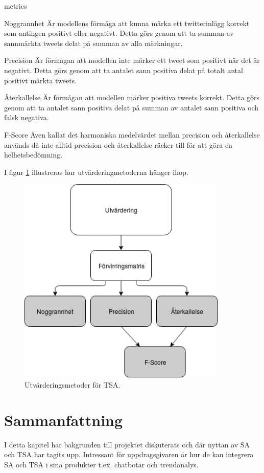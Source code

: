 \documentclass{kaumasters} %
\begin{document}
\begin{labeling}{metrics}
\item [Noggrannhet] Är modellens förmåga att kunna märka ett twitterinlägg korrekt som antingen positivt eller negativt. Detta görs genom att ta summan av sannmärkta tweets delat på summan av alla märkningar.  
\item [Precision]  Är förmågan att modellen inte märker ett tweet som positivt när det är negativt. Detta görs genom att ta antalet sann positiva delat på totalt antal positivt märkta tweets. 
\item [Återkallelse] Är förmågan att modellen märker positiva tweets korrekt. Detta görs genom att ta antalet sann positiva delat på summan av antalet sann positiva och falsk negativa.
\item [F-Score] Även kallat det harmoniska medelvärdet mellan precision och återkallelse används då inte alltid precision och återkallelse räcker till för att göra en helhetsbedömning. 
\end{labeling}

I figur \ref{fig:utv} illustreras hur utvärderingmetoderna hänger ihop.

\begin{figure}[h]
\includegraphics[width=10cm]{utvardering}
\centering
\caption{Utvärderingsmetoder för TSA.}
\label{fig:utv}
\end{figure}


\section{Sammanfattning} \label{BACKsum}
I detta kapitel har bakgrunden till projektet diskuterats och där nyttan av SA och TSA har tagits upp. Intressant för uppdragsgivaren är hur de kan integrera SA och TSA i sina produkter t.ex. chatbotar och trendanalys. 
\end{document}
